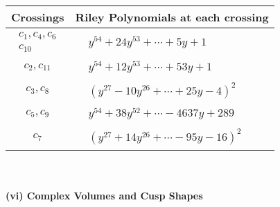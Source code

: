 \documentclass[1p]{elsarticle_modified}
\theoremstyle{definition}
\begin{document}
\begin{tabular}{m{50pt}|m{274pt}}
Crossings & \hspace{64pt}Riley Polynomials at each crossing \\
\hline $$\begin{aligned}c_{1},c_{4},c_{6}\\c_{10}\end{aligned}$$&$\begin{aligned}
&y^{54}+24 y^{53}+\cdots+5 y+1
\end{aligned}$\\
\hline $$\begin{aligned}c_{2},c_{11}\end{aligned}$$&$\begin{aligned}
&y^{54}+12 y^{53}+\cdots+53 y+1
\end{aligned}$\\
\hline $$\begin{aligned}c_{3},c_{8}\end{aligned}$$&$\begin{aligned}
&(y^{27}-10 y^{26}+\cdots+25 y-4)^{2}
\end{aligned}$\\
\hline $$\begin{aligned}c_{5},c_{9}\end{aligned}$$&$\begin{aligned}
&y^{54}+38 y^{52}+\cdots-4637 y+289
\end{aligned}$\\
\hline $$\begin{aligned}c_{7}\end{aligned}$$&$\begin{aligned}
&(y^{27}+14 y^{26}+\cdots-95 y-16)^{2}
\end{aligned}$\\
\hline
\end{tabular}\\~\\
\newpage\flushleft \textbf{(vi) Complex Volumes and Cusp Shapes}
\end{document}
